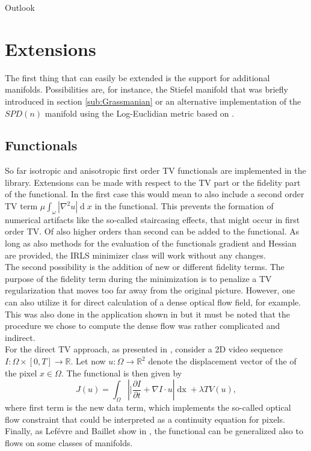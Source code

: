\begin{chapter}{Outlook}
\label{ch:outlook}

\section{Extensions} %
\label{sec:Extensions}
The first thing that can easily be extended is the support for additional manifolds. Possibilities are, for instance, the Stiefel manifold that
was briefly introduced in section \ref{sub:Grassmanian} or an alternative implementation of the $SPD(n)$ manifold using the Log-Euclidian metric
based on \cite{LogEuclidian}.

\subsection{Functionals} %
\label{sub:Functionals}
So far isotropic and anisotropic first order TV functionals are implemented in the library. Extensions can be made with respect to the TV part or the fidelity
part of the functional. In the first case this would mean to also include a second order TV term $\mu\int_{\omega}|\nabla^2u|\mathop{d}x$ in the functional.
This prevents the formation of numerical artifacts like the so-called staircasing effects, that might occur in first order TV. Of also higher orders than second
can be added to the functional. As long as also methods for the evaluation of the functionals gradient and Hessian are provided, the IRLS minimizer class will
work without any changes. \\

The second possibility is the addition of new or different fidelity terms. The purpose of the fidelity term during the minimization is to penalize a TV
regularization that moves too far away from the original picture. However, one can also utilize it for direct calculation of a dense optical flow field, for
example. This was also done in the application shown in \label{sub:reconstructionDenseOpticalFlow} but it must be noted that the procedure we chose to compute 
the dense flow was rather complicated and indirect.\\

For the direct TV approach, as presented in \cite{SceneFlow}, consider a 2D video sequence $I:\Omega\times [0,T]\to\mathbb{R}$.
Let now $u:\Omega\to\mathbb{R}^2$ denote the displacement vector of the of the pixel $x\in\Omega$. The functional is then given by
\begin{equation}
    J(u)=\int_{\Omega}\left\vert|\frac{\partial I}{\partial t}+\nabla I\cdot u\right\vert\mathop{dx}+\lambda TV(u),
\end{equation}
where first term is the new data term, which implements the so-called optical flow constraint that could be interpreted as a continuity equation for pixels.
Finally, as Lef\'{e}vre and Baillet show in \cite{manifoldFlow}, the functional can be generalized also to flows on some classes of manifolds.


\end{chapter}
